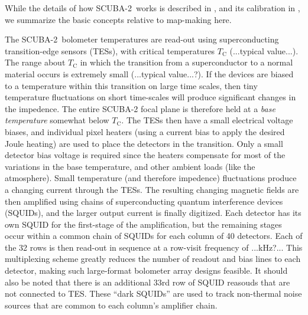 \documentclass[useAMS,usenatbib,nofootinbib]{mn2e}
\newcommand{\scuba}{SCUBA-2}
\begin{document}
While the details of how \scuba\ works is described in
\citet{holland2011}, and its calibration in \citet{dempsey2011}, we
summarize the basic concepts relative to map-making here.

The \scuba\ bolometer temperatures are read-out using superconducting
transition-edge sensors (TESs), with critical temperatures
$T_\mathrm{C}$ (...typical value...). The range about $T_\mathrm{C}$
in which the transition from a superconductor to a normal material
occurs is extremely small (...typical value...?). If the devices are
biased to a temperature within this transition on large time scales,
then tiny temperature fluctuations on short time-scales will produce
significant changes in the impedence. The entire SCUBA-2 focal plane
is therefore held at a \emph{base temperature} somewhat below
$T_\mathrm{C}$. The TESs then have a small electrical voltage biases,
and individual pixel heaters (using a current bias to apply the
desired Joule heating) are used to place the detectors in the
transition. Only a small detector bias voltage is required since the
heaters compensate for most of the variations in the base temperature,
and other ambient loads (like the atmosphere).  Small temperature (and
therefore impedence) fluctuations produce a changing current through
the TESs. The resulting changing magnetic fields are then amplified
using chains of superconducting quantum interference devices (SQUIDs),
and the larger output current is finally digitized. Each detector has
its own SQUID for the first-stage of the amplification, but the
remaining stages occur within a common chain of SQUIDs for each column
of 40 detectors. Each of the 32 rows is then read-out in sequence at a
row-visit frequency of ...kHz?... This multiplexing scheme greatly
reduces the number of readout and bias lines to each detector, making
such large-format bolometer array designs feasible. It should also be
noted that there is an additional 33rd row of SQUID reasouds that are
not connected to TES. These ``dark SQUIDs'' are used to track
non-thermal noise sources that are common to each column's amplifier
chain.
\end{document}

